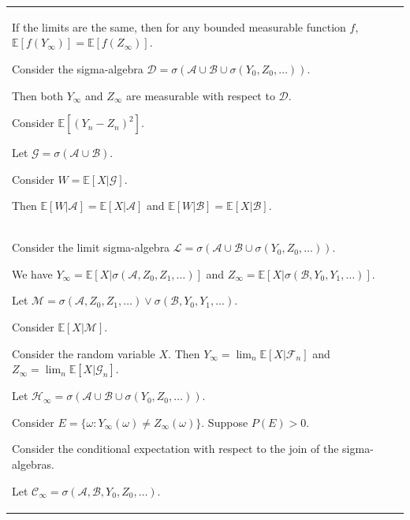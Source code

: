 \documentclass{article}
\theoremstyle{plain}
\theoremstyle{definition}
\theoremstyle{remark}
\newcommand{\defaultlightblue}[1]{{\leavevmode\color{bluec}#1}}
\begin{document}
\begin{longtable}{@{}p{\textwidth}@{}}
{If the limits are the same, then for any bounded measurable function \( f \), \( \mathbb{E}[f(Y_\infty)] = \mathbb{E}[f(Z_\infty)] \).



Consider the sigma-algebra \( \mathcal{D} = \sigma(\mathcal{A} \cup \mathcal{B} \cup \sigma(Y_0, Z_0, \ldots)) \).

Then both \( Y_\infty \) and \( Z_\infty \) are measurable with respect to \( \mathcal{D} \).



Consider \( \mathbb{E}[(Y_n - Z_n)^2] \).



Let \( \mathcal{G} = \sigma(\mathcal{A} \cup \mathcal{B}) \).

Consider \( W = \mathbb{E}[X|\mathcal{G}] \).

Then \( \mathbb{E}[W|\mathcal{A}] = \mathbb{E}[X|\mathcal{A}] \) and \( \mathbb{E}[W|\mathcal{B}] = \mathbb{E}[X|\mathcal{B}] \).

}
\\
\defaultlightblue{

Consider the limit sigma-algebra \( \mathcal{L} = \sigma(\mathcal{A} \cup \mathcal{B} \cup \sigma(Y_0, Z_0, \ldots)) \).

We have \( Y_\infty = \mathbb{E}[X|\sigma(\mathcal{A}, Z_0, Z_1, \ldots)] \) and \( Z_\infty = \mathbb{E}[X|\sigma(\mathcal{B}, Y_0, Y_1, \ldots)] \).



Let \( \mathcal{M} = \sigma(\mathcal{A}, Z_0, Z_1, \ldots) \vee \sigma(\mathcal{B}, Y_0, Y_1, \ldots) \).

Consider \( \mathbb{E}[X|\mathcal{M}] \).



Consider the random variable \( X \). Then \( Y_\infty = \lim_n \mathbb{E}[X|\mathcal{F}_n] \) and \( Z_\infty = \lim_n \mathbb{E}[X|\mathcal{G}_n] \).



Let \( \mathcal{H}_\infty = \sigma(\mathcal{A} \cup \mathcal{B} \cup \sigma(Y_0, Z_0, \ldots)) \).

Consider \( E = \{ \omega : Y_\infty(\omega) \neq Z_\infty(\omega) \} \). Suppose \( P(E) > 0 \).



Consider the conditional expectation with respect to the join of the sigma-algebras.

Let \( \mathcal{C}_\infty = \sigma(\mathcal{A}, \mathcal{B}, Y_0, Z_0, \ldots) \).

}
\end{longtable}
\end{document}
